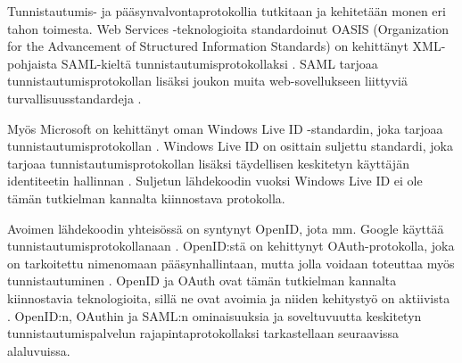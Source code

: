 Tunnistautumis- ja pääsynvalvontaprotokollia tutkitaan ja kehitetään monen eri tahon toimesta. Web Services -teknologioita standardoinut OASIS (Organization for the Advancement of Structured Information Standards) on kehittänyt XML-pohjaista SAML-kieltä tunnistautumisprotokollaksi \cite{saml_spec}. SAML tarjoaa tunnistautumisprotokollan lisäksi joukon muita web-sovellukseen liittyviä turvallisuusstandardeja \cite{next_saml}.

Myös Microsoft on kehittänyt oman Windows Live ID -standardin, joka tarjoaa tunnistautumisprotokollan \cite{open_identity}. Windows Live ID on osittain suljettu standardi, joka tarjoaa tunnistautumisprotokollan lisäksi täydellisen keskitetyn käyttäjän identiteetin hallinnan \cite{open_identity}. Suljetun lähdekoodin vuoksi Windows Live ID ei ole tämän tutkielman kannalta kiinnostava protokolla.

Avoimen lähdekoodin yhteisössä on syntynyt OpenID, jota mm. Google käyttää tunnistautumisprotokollanaan \cite{open_identity}. OpenID:stä on kehittynyt OAuth-pro\-to\-kol\-la, joka on tarkoitettu nimenomaan pääsynhallintaan, mutta jolla voidaan toteuttaa myös tunnistautuminen \cite{formal_oauth}. OpenID ja OAuth ovat tämän tutkielman kannalta kiinnostavia teknologioita, sillä ne ovat avoimia ja niiden kehitystyö on aktiivista \cite{facebook}. OpenID:n, OAuthin ja SAML:n ominaisuuksia ja soveltuvuutta keskitetyn tunnistautumispalvelun rajapintaprotokollaksi tarkastellaan seuraavissa alaluvuissa.